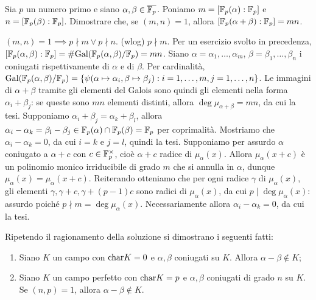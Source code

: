 \begin{exercise}
    Sia $p$ un numero primo e siano $\alpha, \beta \in \overline{\mathbb{F}_p}$. Poniamo $m = [\mathbb{F}_p(\alpha) : \mathbb{F}_p]$ e $n = [\mathbb{F}_p(\beta) : \mathbb{F}_p]$. Dimostrare che, se $(m, n) = 1$, allora $[\mathbb{F}_p(\alpha + \beta) : \mathbb{F}_p] = mn$.
\end{exercise}
\begin{solution}
    $(m, n) = 1 \implies p \nmid m \lor p \nmid n$. (wlog) $p \nmid m$.
    Per un esercizio svolto in precedenza, $[\mathbb{F}_p(\alpha, \beta) : \mathbb{F}_p] = \#\text{Gal}(\mathbb{F}_p(\alpha, \beta) / \mathbb{F}_p) = mn$. Siano $\alpha = \alpha_1, \dots, \alpha_m$, $\beta = \beta_1, \dots, \beta_n$ i coniugati rispettivamente di $\alpha$ e di $\beta$. Per cardinalità, $\text{Gal}(\mathbb{F}_p(\alpha, \beta) / \mathbb{F}_p) = \{ \psi(\alpha \mapsto \alpha_i, \beta \mapsto \beta_j) : i = 1, \dots, m, j = 1, \dots, n \}$. Le immagini di $\alpha + \beta$ tramite gli elementi del Galois sono quindi gli elementi nella forma $\alpha_i + \beta_j$: se queste sono $mn$ elementi distinti, allora $\deg \mu_{\alpha + \beta} = mn$, da cui la tesi. Supponiamo
     $\alpha_i + \beta_j = \alpha_k + \beta_l$, allora $\alpha_i - \alpha_k = \beta_l - \beta_j \in \mathbb{F}_p(\alpha) \cap \mathbb{F}_p(\beta) = \mathbb{F}_p$ per coprimalità. Mostriamo che $\alpha_i - \alpha_k = 0$, da cui $i = k$ e $j = l$, quindi la tesi. Supponiamo per assurdo $\alpha$ coniugato a $\alpha + c$ con $c \in \mathbb{F}_p^\times$, cioè $\alpha + c$ radice di $\mu_\alpha(x)$. Allora $\mu_\alpha(x + c)$ è un polinomio monico irriducibile di grado $m$ che si annulla in $\alpha$, dunque $\mu_\alpha(x) = \mu_\alpha(x + c)$. Reiterando otteniamo che per ogni radice $\gamma$ di $\mu_\alpha(x)$, gli elementi $\gamma, \gamma + c, \gamma + (p-1)c$ sono radici di $\mu_\alpha(x)$, da cui $p \mid \deg \mu_\alpha(x)$: assurdo poiché $p \nmid m = \deg \mu_\alpha(x)$. Necessariamente allora $\alpha_i - \alpha_k = 0$, da cui la tesi.
\end{solution}

Ripetendo il ragionamento della soluzione si dimostrano i seguenti fatti:
\begin{enumerate}
    \item Siano $K$ un campo con $\text{char} K = 0$ e $\alpha, \beta$ coniugati su $K$. Allora $\alpha - \beta \notin K$;
    \item Siano $K$ un campo perfetto con $\text{char} K = p$ e $\alpha, \beta$ coniugati di grado $n$ su $K$. Se $(n, p) = 1$, allora $\alpha - \beta \notin K$.
\end{enumerate}
